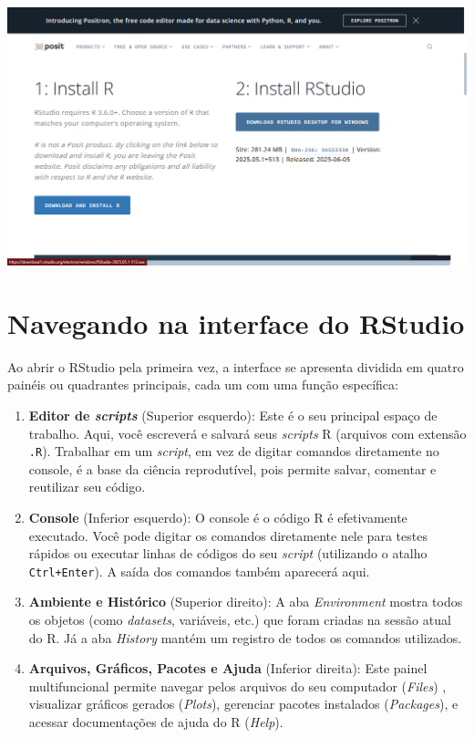 \documentclass[
  12pt,
  letterpaper,
  DIV=11,
  numbers=noendperiod]{scrreprt}
\providecommand{\tightlist}{%
  \setlength{\itemsep}{0pt}\setlength{\parskip}{0pt}}\usepackage{longtable,booktabs,array}
\theoremstyle{definition}
\theoremstyle{exemplo}
\begin{document}
\includegraphics{images/clipboard-386187942.png}

\section{Navegando na interface do
RStudio}\label{navegando-na-interface-do-rstudio}

Ao abrir o RStudio pela primeira vez, a interface se apresenta dividida
em quatro painéis ou quadrantes principais, cada um com uma função
específica:

\begin{enumerate}
\def\labelenumi{\arabic{enumi}.}
\tightlist
\item
  \textbf{Editor de \emph{scripts}} (Superior esquerdo): Este é o seu
  principal espaço de trabalho. Aqui, você escreverá e salvará seus
  \emph{scripts} R (arquivos com extensão \texttt{.R}). Trabalhar em um
  \emph{script}, em vez de digitar comandos diretamente no console, é a
  base da ciência reprodutível, pois permite salvar, comentar e
  reutilizar seu código.
\item
  \textbf{Console} (Inferior esquerdo): O console é o código R é
  efetivamente executado. Você pode digitar os comandos diretamente nele
  para testes rápidos ou executar linhas de códigos do seu \emph{script}
  (utilizando o atalho \texttt{Ctrl+Enter}). A saída dos comandos também
  aparecerá aqui.
\item
  \textbf{Ambiente e Histórico} (Superior direito): A aba
  \emph{Environment} mostra todos os objetos (como \emph{datasets},
  variáveis, etc.) que foram criadas na sessão atual do R. Já a aba
  \emph{History} mantém um registro de todos os comandos utilizados.
\item
  \textbf{Arquivos, Gráficos, Pacotes e Ajuda} (Inferior direita): Este
  painel multifuncional permite navegar pelos arquivos do seu computador
  (\emph{Files}) , visualizar gráficos gerados (\emph{Plots}), gerenciar
  pacotes instalados (\emph{Packages}), e acessar documentações de ajuda
  do R (\emph{Help}).
\end{enumerate}
\end{document}
